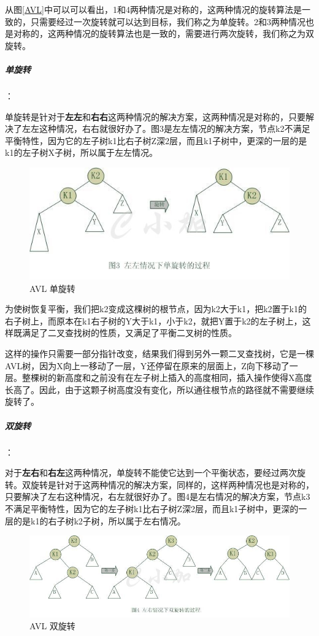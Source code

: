 \documentclass[UTF8,a4paper,12pt]{ctexbook}
\begin{document}
			从图\ref{AVL}中可以可以看出，1和4两种情况是对称的，这两种情况的旋转算法是一致的，只需要经过一次旋转就可以达到目标，我们称之为单旋转。2和3两种情况也是对称的，这两种情况的旋转算法也是一致的，需要进行两次旋转，我们称之为双旋转。
				
			\subparagraph{单旋转}：
			
				单旋转是针对于\textbf{左左}和\textbf{右右}这两种情况的解决方案，这两种情况是对称的，只要解决了左左这种情况，右右就很好办了。图3是左左情况的解决方案，节点k2不满足平衡特性，因为它的左子树k1比右子树Z深2层，而且k1子树中，更深的一层的是k1的左子树X子树，所以属于左左情况。
					\begin{figure}[H]
						\centering
						\includegraphics[scale = 0.8]{Rotate_1.jpg}
						\caption{AVL 单旋转}
					\end{figure}
					
				为使树恢复平衡，我们把k2变成这棵树的根节点，因为k2大于k1，把k2置于k1的右子树上，而原本在k1右子树的Y大于k1，小于k2，就把Y置于k2的左子树上，这样既满足了二叉查找树的性质，又满足了平衡二叉树的性质。
				
				这样的操作只需要一部分指针改变，结果我们得到另外一颗二叉查找树，它是一棵AVL树，因为X向上一移动了一层，Y还停留在原来的层面上，Z向下移动了一层。整棵树的新高度和之前没有在左子树上插入的高度相同，插入操作使得X高度长高了。因此，由于这颗子树高度没有变化，所以通往根节点的路径就不需要继续旋转了。
					
			\subparagraph{双旋转}：
			
				对于\textbf{左右}和\textbf{右左}这两种情况，单旋转不能使它达到一个平衡状态，要经过两次旋转。双旋转是针对于这两种情况的解决方案，同样的，这样两种情况也是对称的，只要解决了左右这种情况，右左就很好办了。图4是左右情况的解决方案，节点k3不满足平衡特性，因为它的左子树k1比右子树Z深2层，而且k1子树中，更深的一层的是k1的右子树k2子树，所以属于左右情况。
				\begin{figure}[H]
					\centering
					\includegraphics[scale = 0.8]{Rotate_2.jpg}
					\caption{AVL 双旋转}
				\end{figure}
				
\end{document}

